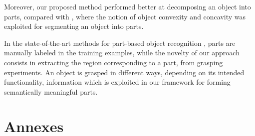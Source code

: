\documentclass[a4paper,11pt,pdf]{pacmanreport}
\begin{document}
Moreover, our proposed method performed better at decomposing an object into 
parts, compared with \cite{rel7}, where the notion of object convexity and 
concavity was exploited for segmenting an object into parts.

In the state-of-the-art methods for part-based object recognition 
\cite{part2,part3,part1}, parts are manually labeled in the training examples, 
while the novelty of our approach consists in extracting the region 
corresponding to a part, from grasping experiments. An object is grasped in 
different ways, depending on its intended functionality, information which is 
exploited in our framework for forming semantically meaningful parts.

\newpage




\newpage

\appendix

\section{Annexes}

\end{document}
